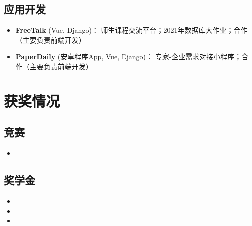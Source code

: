 \documentclass{resume}
\begin{document}
\subsection{\textbf{应用开发}}
\begin{itemize}

  \item \textbf{FreeTalk} (Vue, Django)：
        师生课程交流平台；2021年数据库大作业；合作（主要负责前端开发）

  \item \textbf{PaperDaily} (安卓程序App, Vue, Django)：
        专家-企业需求对接小程序；合作（主要负责前端开发）
\end{itemize}

\section{获奖情况}
\subsection{\textbf{竞赛}}
\begin{itemize}
  \item {}
\end{itemize}

\subsection{\textbf{奖学金}}
\begin{itemize}
  \item {}
  \item {}
  \item {}
\end{itemize}
\end{document}
